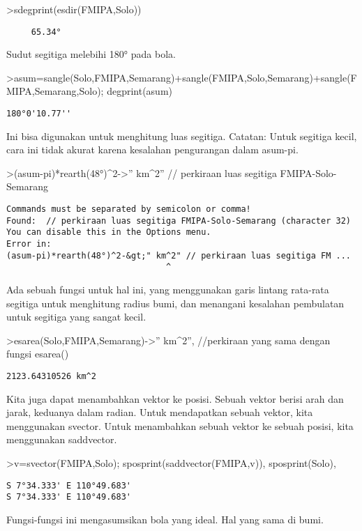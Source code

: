 \documentclass[
]{book}
\begin{document}
\textgreater sdegprint(esdir(FMIPA,Solo))

\begin{verbatim}
     65.34°
\end{verbatim}

Sudut segitiga melebihi 180° pada bola.

\textgreater asum=sangle(Solo,FMIPA,Semarang)+sangle(FMIPA,Solo,Semarang)+sangle(FMIPA,Semarang,Solo); degprint(asum)

\begin{verbatim}
180°0'10.77''
\end{verbatim}

Ini bisa digunakan untuk menghitung luas segitiga. Catatan: Untuk segitiga kecil, cara ini tidak akurat karena kesalahan pengurangan dalam asum-pi.

\textgreater(asum-pi)*rearth(48°)\^{}2-\textgreater'' km\^{}2'' // perkiraan luas segitiga FMIPA-Solo-Semarang

\begin{verbatim}
Commands must be separated by semicolon or comma!
Found:  // perkiraan luas segitiga FMIPA-Solo-Semarang (character 32)
You can disable this in the Options menu.
Error in:
(asum-pi)*rearth(48°)^2-&gt;" km^2" // perkiraan luas segitiga FM ...
                                ^
\end{verbatim}

Ada sebuah fungsi untuk hal ini, yang menggunakan garis lintang rata-rata segitiga untuk menghitung radius bumi, dan menangani kesalahan pembulatan untuk segitiga yang sangat kecil.

\textgreater esarea(Solo,FMIPA,Semarang)-\textgreater'' km\^{}2'', //perkiraan yang sama dengan fungsi esarea()

\begin{verbatim}
2123.64310526 km^2
\end{verbatim}

Kita juga dapat menambahkan vektor ke posisi. Sebuah vektor berisi arah dan jarak, keduanya dalam radian. Untuk mendapatkan sebuah vektor, kita menggunakan svector. Untuk menambahkan sebuah vektor ke sebuah posisi, kita menggunakan saddvector.

\textgreater v=svector(FMIPA,Solo); sposprint(saddvector(FMIPA,v)), sposprint(Solo),

\begin{verbatim}
S 7°34.333' E 110°49.683'
S 7°34.333' E 110°49.683'
\end{verbatim}

Fungsi-fungsi ini mengasumsikan bola yang ideal. Hal yang sama di bumi.
\end{document}
